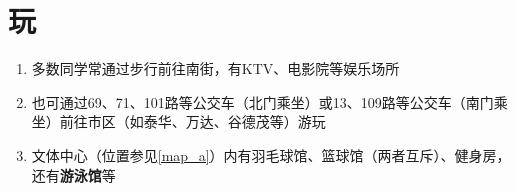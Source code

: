 \section[玩]{玩}
\begin{enumerate}
    \item 多数同学常通过步行前往南街，有KTV、电影院等娱乐场所
    \item 也可通过69、71、101路等公交车（北门乘坐）或13、109路等公交车（南门乘坐）前往市区（如泰华、万达、谷德茂等）游玩
    \item 文体中心（位置参见\uline{\ref{map_a}}）内有羽毛球馆、篮球馆（两者互斥）、健身房，还有\textbf{游泳馆}等\footnotemark
\end{enumerate}